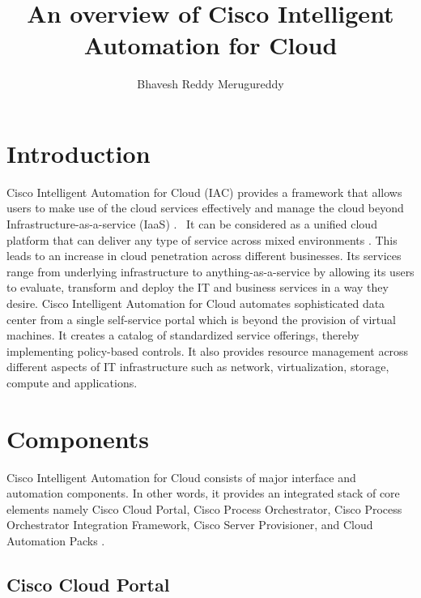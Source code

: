 \documentclass[9pt,twocolumn,twoside]{../../styles/osajnl}
\title{An overview of Cisco Intelligent Automation for Cloud}
\author[1,*]{Bhavesh Reddy Merugureddy}
\affil[1]{School of Informatics and Computing, Bloomington, IN 47408, U.S.A.}
\affil[*]{Corresponding authors: bmerugur@umail.iu.edu}
\begin{document}
\maketitle
{}
\section{Introduction}

Cisco Intelligent Automation for Cloud (IAC) provides a framework that
allows users to make use of the cloud services effectively and manage
the cloud beyond Infrastructure-as-a-service (IaaS)
\cite{ciscolive-introduction}.  It can be considered as a unified
cloud platform that can deliver any type of service across mixed
environments \cite{cisco-wikibon}. This leads to an increase in cloud
penetration across different businesses. Its services range from
underlying infrastructure to anything-as-a-service by allowing its
users to evaluate, transform and deploy the IT and business services
in a way they desire. Cisco Intelligent Automation for Cloud automates
sophisticated data center from a single self-service portal which is
beyond the provision of virtual machines. It creates a catalog of
standardized service offerings, thereby implementing policy-based
controls. It also provides resource management across different
aspects of IT infrastructure such as network, virtualization, storage,
compute and applications.

\section{Components}

Cisco Intelligent Automation for Cloud consists of major interface and
automation components. In other words, it provides an integrated stack
of core elements namely Cisco Cloud Portal, Cisco Process
Orchestrator, Cisco Process Orchestrator Integration Framework, Cisco
Server Provisioner, and Cloud Automation Packs \cite{cisco-datasheet}.

\subsection{Cisco Cloud Portal}
\end{document}
